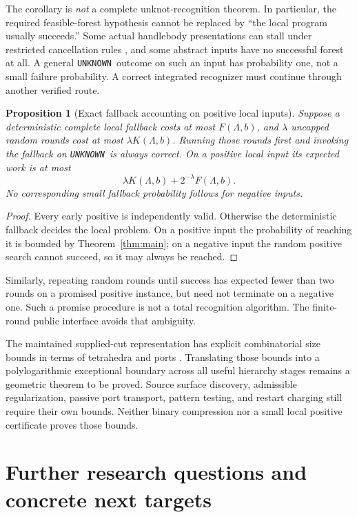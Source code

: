 \documentclass[11pt,letterpaper]{article}
\newtheorem{proposition}[theorem]{Proposition}
\theoremstyle{definition}
\newcommand{\Unk}{\texttt{UNKNOWN}}
\begin{document}
The corollary is \emph{not} a complete unknot-recognition theorem. In
particular, the required feasible-forest hypothesis cannot be replaced by
``the local program usually succeeds.'' Some actual handlebody presentations
can stall under restricted cancellation rules \cite{repo,loop}, and some
abstract inputs have no successful forest at all. A general \Unk\ outcome
on such an input has probability one, not a small failure probability.
A correct integrated recognizer must continue through another verified route.

\begin{proposition}[Exact fallback accounting on positive local inputs]
Suppose a deterministic complete local fallback costs at most $F(\Lambda,b)$,
and $\lambda$ uncapped random rounds cost at most $\lambda K(\Lambda,b)$.
Running those rounds first and invoking the fallback on \Unk\ is always
correct. On a positive local input its expected work is at most
\[
 \lambda K(\Lambda,b)+2^{-\lambda}F(\Lambda,b).
\]
No corresponding small fallback probability follows for negative inputs.
\end{proposition}
\begin{proof}
Every early positive is independently valid. Otherwise the deterministic
fallback decides the local problem. On a positive input the probability of
reaching it is bounded by Theorem~\ref{thm:main}; on a negative input the
random positive search cannot succeed, so it may always be reached.
\end{proof}
Similarly, repeating random rounds until success has expected fewer than
two rounds on a promised positive instance, but need not terminate on a
negative one. Such a promise procedure is not a total recognition algorithm.
The finite-round public interface avoids that ambiguity.

The maintained supplied-cut representation has explicit combinatorial size
bounds in terms of tetrahedra and ports \cite{kernel}. Translating those
bounds into a polylogarithmic exceptional boundary across all useful
hierarchy stages remains a geometric theorem to be proved. Source surface
discovery, admissible regularization, passive port transport, pattern testing,
and restart charging still require their own bounds. Neither binary
compression nor a small local positive certificate proves those bounds.

\section{Further research questions and concrete next targets}\label{sec:future}
\end{document}
